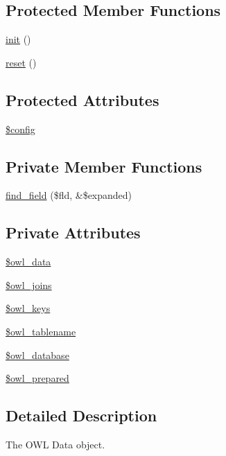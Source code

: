 \subsection*{Protected Member Functions}
\begin{CompactItemize}
\item 
\hyperlink{class__OWL_e0ef3ded56e8a6b34b6461e5a721cd3e}{init} ()
\item 
\hyperlink{class__OWL_2f2a042bcf31965194c03033df0edc9b}{reset} ()
\end{CompactItemize}
\subsection*{Protected Attributes}
\begin{CompactItemize}
\item 
\hyperlink{class__OWL_f37a011667dda12fc417a68a6f3077d1}{\$config}
\end{CompactItemize}
\subsection*{Private Member Functions}
\begin{CompactItemize}
\item 
\hyperlink{classDataHandler_1e4789e22370c96ae479bc3a58f30984}{find\_\-field} (\$fld, \&\$expanded)
\end{CompactItemize}
\subsection*{Private Attributes}
\begin{CompactItemize}
\item 
\hyperlink{classDataHandler_329b5524c379e0db6c4d5ce59f3c414f}{\$owl\_\-data}
\item 
\hyperlink{classDataHandler_da9b697f81ea82d269077f9c7445791d}{\$owl\_\-joins}
\item 
\hyperlink{classDataHandler_8d398720bce975159b2d13ad7a941bc7}{\$owl\_\-keys}
\item 
\hyperlink{classDataHandler_24620784bde262bdd02227962d3b9605}{\$owl\_\-tablename}
\item 
\hyperlink{classDataHandler_3ac49aa018e0ebe4c74f5a636d455a8b}{\$owl\_\-database}
\item 
\hyperlink{classDataHandler_e6093d21291ed3ab3183e11962452928}{\$owl\_\-prepared}
\end{CompactItemize}


\subsection{Detailed Description}
The OWL Data object. 

